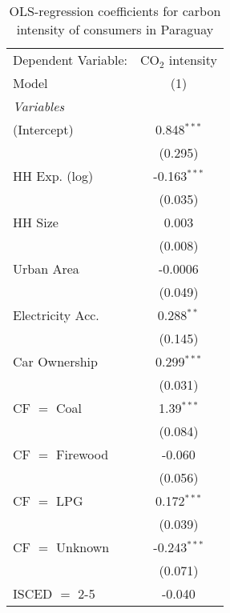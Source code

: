 
\begin{table}[htbp!]
   \centering
   \small
   \begin{adjustbox}{width = 1\textwidth, max height = 0.95\textheight, center}
      \begin{threeparttable}[b]
         \caption{\label{tab:OLS_1_PRY} OLS-regression coefficients for carbon intensity of consumers in Paraguay}
         \begin{tabular}{lc}
            \tabularnewline \midrule \midrule
            Dependent Variable: & CO$_{2}$ intensity\\  
            Model               & (1)\\  
            \midrule
            \emph{Variables}\\
            (Intercept)         & 0.848$^{***}$\\   
                                & (0.295)\\   
            HH Exp. (log)       & -0.163$^{***}$\\   
                                & (0.035)\\   
            HH Size             & 0.003\\   
                                & (0.008)\\   
            Urban Area          & -0.0006\\   
                                & (0.049)\\   
            Electricity Acc.    & 0.288$^{**}$\\   
                                & (0.145)\\   
            Car Ownership       & 0.299$^{***}$\\   
                                & (0.031)\\   
            CF $=$ Coal         & 1.39$^{***}$\\   
                                & (0.084)\\   
            CF $=$ Firewood     & -0.060\\   
                                & (0.056)\\   
            CF $=$ LPG          & 0.172$^{***}$\\   
                                & (0.039)\\   
            CF $=$ Unknown      & -0.243$^{***}$\\   
                                & (0.071)\\   
            ISCED $=$ 2-5       & -0.040\\   

\end{tabular}
\end{threeparttable}
\end{adjustbox}
\end{table}

